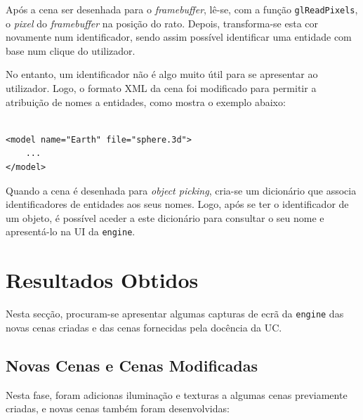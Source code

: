 \documentclass[12pt, a4paper]{article}
\begin{document}
Após a cena ser desenhada para o \emph{framebuffer}, lê-se, com a função \texttt{glReadPixels}, o
\emph{pixel} do \emph{framebuffer} na posição do rato. Depois, transforma-se esta cor novamente num
identificador, sendo assim possível identificar uma entidade com base num clique do utilizador.

No entanto, um identificador não é algo muito útil para se apresentar ao utilizador. Logo, o formato
XML da cena foi modificado para permitir a atribuição de nomes a entidades, como mostra o exemplo
abaixo:

\begin{lstlisting}

<model name="Earth" file="sphere.3d">
    ...
</model>
\end{lstlisting}

Quando a cena é desenhada para \emph{object picking}, cria-se um dicionário que associa
identificadores de entidades aos seus nomes. Logo, após se ter o identificador de um objeto, é
possível aceder a este dicionário para consultar o seu nome e apresentá-lo na UI da \texttt{engine}.

\section{Resultados Obtidos}

Nesta secção, procuram-se apresentar algumas capturas de ecrã da \texttt{engine} das novas cenas
criadas e das cenas fornecidas pela docência da UC.

\subsection{Novas Cenas e Cenas Modificadas}

Nesta fase, foram adicionas iluminação e texturas a algumas cenas previamente criadas, e novas cenas
também foram desenvolvidas:
\end{document}
